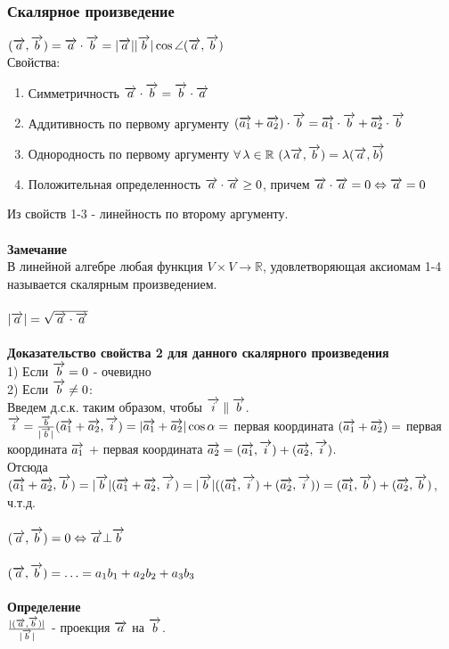 \documentclass[12pt]{article}
\begin{document}
\subsubsection{Скалярное произведение}
$(\overrightarrow{a},\overrightarrow{b}) = \overrightarrow{a}\cdot\overrightarrow{b} = |\overrightarrow{a}||\overrightarrow{b}|\cos \angle(\overrightarrow{a},\overrightarrow{b})$\\
Свойства:
\begin{enumerate}
    \item Симметричность $\overrightarrow{a}\cdot\overrightarrow{b} = \overrightarrow{b}\cdot\overrightarrow{a}$
    \item Аддитивность по первому аргументу $(\overrightarrow{a_1}+\overrightarrow{a_2})\cdot\overrightarrow{b} = \overrightarrow{a_1}\cdot\overrightarrow{b}+\overrightarrow{a_2}\cdot\overrightarrow{b}$
    \item Однородность по первому аргументу $\forall\,\lambda \in \mathbb{R}\ (\lambda\vect{a},\vect{b}) = \lambda(\vect{a},\vect{b)}$
    \item Положительная определенность $\overrightarrow{a}\cdot\overrightarrow{a} \geq 0$, причем $\overrightarrow{a}\cdot\overrightarrow{a}=0 \Leftrightarrow \overrightarrow{a} = 0$
\end{enumerate}
Из свойств 1-3 - линейность по второму аргументу.\\\\
\textbf{Замечание}\\
В линейной алгебре любая функция $V\times V \rightarrow \mathbb{R}$, удовлетворяющая аксиомам 1-4 называется скалярным произведением.\\\\
$|\overrightarrow{a}| = \sqrt{\overrightarrow{a}\cdot\overrightarrow{a}}$\\\\
\textbf{Доказательство свойства 2 для данного скалярного произведения}\\
1) Если $\overrightarrow{b} = 0$ - очевидно\\
2) Если $\overrightarrow{b} \neq 0$:\\
Введем д.с.к. таким образом, чтобы $\overrightarrow{i} \parallel \overrightarrow{b}$.\\
$\overrightarrow{i} = \frac{\overrightarrow{b}}{|\overrightarrow{b}|}\\
(\overrightarrow{a_1}+\overrightarrow{a_2}, \overrightarrow{i}) = |\overrightarrow{a_1}+\overrightarrow{a_2}|\cos \alpha = $ первая координата $(\overrightarrow{a_1}+\overrightarrow{a_2}) = $ первая координата $\overrightarrow{a_1}$ + первая координата $\overrightarrow{a_2} = (\overrightarrow{a_1}, \overrightarrow{i}) + (\overrightarrow{a_2}, \overrightarrow{i})$.\\
Отсюда $(\overrightarrow{a_1}+\overrightarrow{a_2},\overrightarrow{b}) = |\overrightarrow{b}|(\overrightarrow{a_1}+\overrightarrow{a_2},\overrightarrow{i})=|\overrightarrow{b}|((\overrightarrow{a_1},\overrightarrow{i})+(\overrightarrow{a_2},\overrightarrow{i})) = (\overrightarrow{a_1},\overrightarrow{b})+(\overrightarrow{a_2},\overrightarrow{b})$, ч.т.д.\\\\
$(\overrightarrow{a},\overrightarrow{b})=0 \Leftrightarrow \overrightarrow{a}\bot\overrightarrow{b}$\\\\
$(\overrightarrow{a},\overrightarrow{b}) = \ldots = a_1b_1+a_2b_2+a_3b_3$\\\\
\textbf{Определение}\\
$\frac{|(\overrightarrow{a},\overrightarrow{b})|}{
|\overrightarrow{b}|}$ - проекция $\overrightarrow{a}$ на $\overrightarrow{b}$.\\
\end{document}

